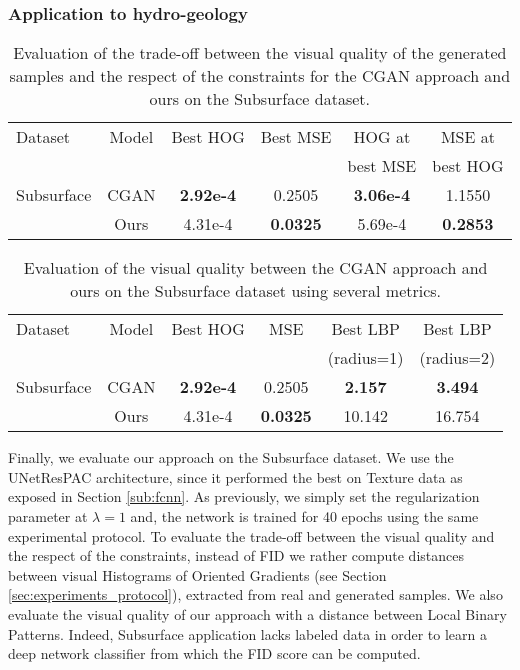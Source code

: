 \subsubsection{Application to hydro-geology}
\label{subs:subsurface}

\begin{table}
	\centering
	\begin{tabular}{l c c c c c}
		\Bigrule
		Dataset &Model           & Best \ac{HOG} & Best \ac{MSE}& \ac{HOG} at & \ac{MSE} at \\
		&&& &  best \ac{MSE} & best \ac{HOG} \\
		\bigrule
		Subsurface &CGAN   & \textbf{2.92e-4} & 0.2505 & \textbf{3.06e-4}  & 1.1550 \\
		&Ours            & 4.31e-4 & \textbf{0.0325}& 5.69e-4 & \textbf{0.2853} \\
	\end{tabular}
	\caption[Evaluation of the trade-off between the visual quality of the respect of the constraints for the Subsurface dataset]{Evaluation of the trade-off between the visual quality of the generated samples and the respect of the constraints for the CGAN approach and ours on the Subsurface dataset.}
	\label{tab:subsurface}
\end{table}

\begin{table}[t]
	\centering
	\begin{tabular}{l c c c c c}
		\Bigrule
		Dataset &Model           & Best \ac{HOG} &  \ac{MSE}& Best \ac{LBP} & Best \ac{LBP} \\
		&&& & (radius=1) & (radius=2) \\
		\bigrule
		Subsurface &CGAN   & \textbf{2.92e-4} & 0.2505 & \textbf{2.157} & \textbf{3.494}\\
		&Ours            &  4.31e-4 &\textbf{0.0325} & 10.142 & 16.754 \\

	\end{tabular}
	\caption[Evaluation of the visual quality on the Subsurface dataset]{Evaluation of the visual quality between the CGAN approach and ours on the Subsurface dataset using several metrics.}
	\label{tab:subsurface_visual}
\end{table}

Finally, we evaluate our approach on the Subsurface dataset. We use the UNetResPAC  architecture, since it performed the best on Texture data as exposed in Section \ref{sub:fcnn}. As previously, we simply set the regularization parameter at $\lambda=1$ and, the network is trained for 40 epochs using the same experimental protocol. To evaluate the trade-off between the visual quality and the respect of the constraints, instead of FID we rather compute distances between visual Histograms of Oriented Gradients (see Section \ref{sec:experiments_protocol}), extracted from real and generated samples. We also evaluate the visual quality of our approach with a distance between Local Binary Patterns. Indeed, Subsurface application lacks labeled data in order to learn a deep network classifier from which the FID score can be computed. 

